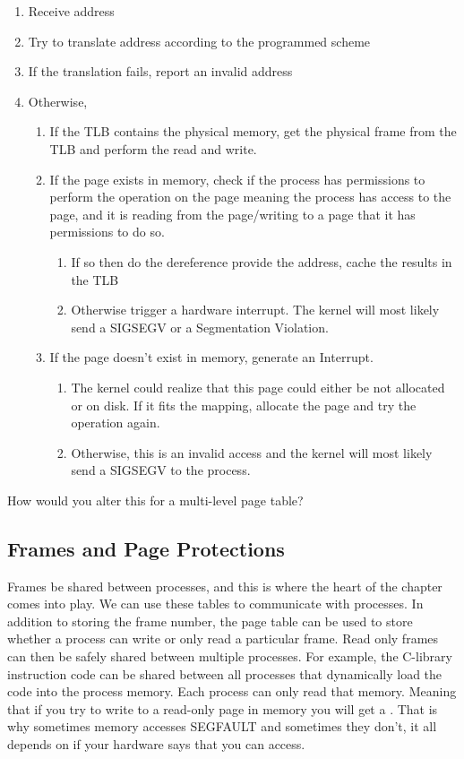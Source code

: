 \begin{enumerate}
\item Receive address
\item Try to translate address according to the programmed scheme
\item If the translation fails, report an invalid address
\item Otherwise,
	\begin{enumerate}
  \item If the TLB contains the physical memory, get the physical frame from the TLB and perform the read and write.
	\item If the page exists in memory, check if the process has permissions
		to perform the operation on the page meaning the process has access
		to the page, and it is reading from the page/writing to a page
		that it has permissions to do so.
		\begin{enumerate}
		\item If so then do the dereference provide the address, cache the results in the TLB
		\item Otherwise trigger a hardware interrupt. The kernel
			will most likely send a SIGSEGV or a Segmentation Violation.
		\end{enumerate}
	\item If the page doesn't exist in memory, generate an Interrupt.
		\begin{enumerate}
		\item The kernel could realize that this page could either be not
			allocated or on disk.
      If it fits the mapping, allocate the page and try the operation again.
		\item Otherwise, this is an invalid access and the kernel will most likely send a SIGSEGV to the process.
		\end{enumerate}
	\end{enumerate}
\end{enumerate}

How would you alter this for a multi-level page table?

\subsection{Frames and Page Protections}

Frames be shared between processes, and this is where the heart of the chapter comes into play.
We can use these tables to communicate with processes.
In addition to storing the frame number, the page table can be used to store whether a process can write or only read a particular frame.
Read only frames can then be safely shared between multiple processes.
For example, the C-library instruction code can be shared between all processes that dynamically load the code into the process memory.
Each process can only read that memory.
Meaning that if you try to write to a read-only page in memory you will get a .
That is why sometimes memory accesses SEGFAULT and sometimes they don't, it all depends on if your hardware says that you can access.

